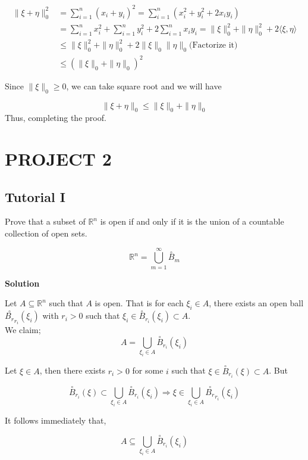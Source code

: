 \documentclass{article}
\begin{document}
$$
\begin{aligned}
\|\xi+\eta\|_{0}^{2} & =\sum_{i=1}^{n}\left(x_{i}+y_{i}\right)^{2}=\sum_{i=1}^{n}\left(x_{i}^{2}+y_{i}^{2}+2 x_{i} y_{i}\right) \\
& =\sum_{i=1}^{n} x_{i}^{2}+\sum_{i=1}^{n} y_{i}^{2}+2 \sum_{i=1}^{n} x_{i} y_{i}=\|\xi\|_{0}^2+\|\eta\|_{0}^2+2\langle\xi, \eta\rangle \\
& \leq\|\xi\|_{0}^2+\|\eta\|_{0}^2+2\|\xi\|_{0}\|\eta\|_{0}\text{(Factorize it)}\\
&
\leq \left(\|\xi\|_{0}+\|\eta\|_{0}\right)^{2}
\end{aligned}
$$

Since $\|\xi\|_{0} \geq 0$, we can take square root and we will have

$$
\|\xi+\eta\|_{0} \leq\|\xi\|_{0}+\|\eta\|_{0}
$$
Thus, completing the proof.
\section{PROJECT 2}
\subsection{Tutorial I}
Prove that a subset of $\mathbb{R}^{n}$ is open if and only if it is the union of a countable collection of open sets.

$$
\mathbb{R}^{n}=\bigcup_{m=1}^{\infty} \stackrel{\circ}{B}_{m}
$$



\textbf{Solution}

Let $A \subseteq \mathbb{R}^{n}$ such that $A$ is open. That is for each $\xi_{i} \in A$, there exists an open ball ${\stackrel{\circ}{B_{r}}}_{r_{i}}\left(\xi_{i}\right)$ with $r_{i}>0$ such that $\xi_{i} \in \stackrel{\circ}{B}_{r_{i}}\left(\xi_{i}\right) \subset A$.\\

We claim;
$$
A=\bigcup_{\xi_{i} \in A} \stackrel{\circ}{B}_{r_{i}}\left(\xi_{i}\right)
$$

Let $\xi \in A$, then there exists $r_{i}>0$ for some $i$ such that $\xi \in \stackrel{\circ}{B}_{r_{i}}(\xi) \subset A$. But

$$
\stackrel{\circ}{B}_{r_{i}}(\xi) \subset \bigcup_{\xi_{i} \in A} \stackrel{\circ}{B}_{r_{i}}\left(\xi_{i}\right) \Longrightarrow \xi \in \bigcup_{\xi_{i} \in A}{\stackrel{\circ}{B_{r}}}_{r_{i}}\left(\xi_{i}\right)
$$

It follows immediately that,

\begin{equation}
A \subseteq \bigcup_{\xi_{i} \in A} \stackrel{\circ}{B}_{r_{i}}\left(\xi_{i}\right)
\end{equation}
\end{document}
